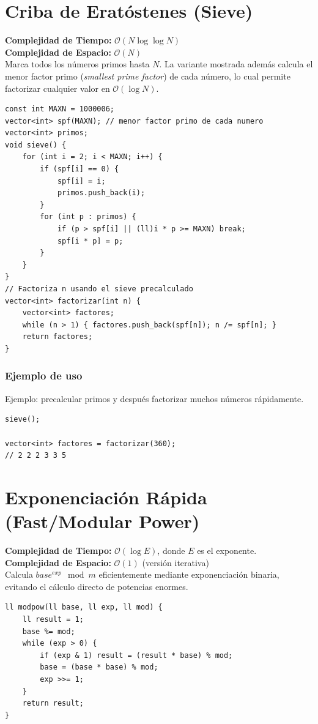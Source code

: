 \documentclass[10pt,twocolumn,letterpaper]{report}
\begin{document}
\section{Criba de Eratóstenes (Sieve)}
\textbf{Complejidad de Tiempo:} $\mathcal{O}(N \log \log N)$ \\
\textbf{Complejidad de Espacio:} $\mathcal{O}(N)$ \\
Marca todos los números primos hasta $N$. La variante mostrada además calcula el menor factor primo (\textit{smallest prime factor}) de cada número, lo cual permite factorizar cualquier valor en $\mathcal{O}(\log N)$.
\begin{lstlisting}
const int MAXN = 1000006;
vector<int> spf(MAXN); // menor factor primo de cada numero
vector<int> primos;
void sieve() {
    for (int i = 2; i < MAXN; i++) {
        if (spf[i] == 0) {
            spf[i] = i;
            primos.push_back(i);
        }
        for (int p : primos) {
            if (p > spf[i] || (ll)i * p >= MAXN) break;
            spf[i * p] = p;
        }
    }
}
// Factoriza n usando el sieve precalculado
vector<int> factorizar(int n) {
    vector<int> factores;
    while (n > 1) { factores.push_back(spf[n]); n /= spf[n]; }
    return factores;
}
\end{lstlisting}
\subsubsection*{Ejemplo de uso}
Ejemplo: precalcular primos y después factorizar muchos números rápidamente.
\begin{lstlisting}
sieve();

vector<int> factores = factorizar(360);
// 2 2 2 3 3 5
\end{lstlisting}

\section{Exponenciación Rápida (Fast/Modular Power)}
\textbf{Complejidad de Tiempo:} $\mathcal{O}(\log E)$, donde $E$ es el exponente. \\
\textbf{Complejidad de Espacio:} $\mathcal{O}(1)$ (versión iterativa) \\
Calcula $base^{exp} \mod m$ eficientemente mediante exponenciación binaria, evitando el cálculo directo de potencias enormes.
\begin{lstlisting}
ll modpow(ll base, ll exp, ll mod) {
    ll result = 1;
    base %= mod;
    while (exp > 0) {
        if (exp & 1) result = (result * base) % mod;
        base = (base * base) % mod;
        exp >>= 1;
    }
    return result;
}
\end{lstlisting}
\end{document}
